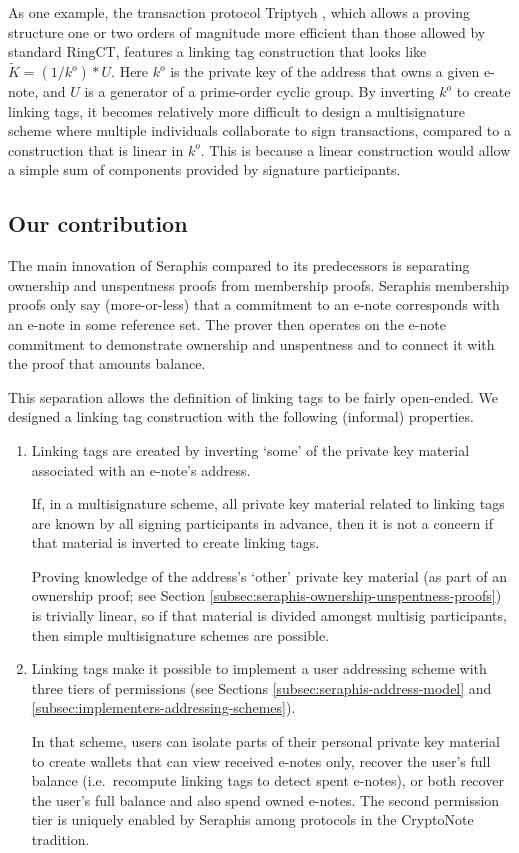 As one example, the transaction protocol Triptych \cite{triptych-preprint}, which allows a proving structure one or two orders of magnitude more efficient than those allowed by standard RingCT, features a linking tag construction that looks like $\tilde{K} = (1/k^o)*U$. Here $k^o$ is the private key of the address that owns a given e-note, and $U$ is a generator of a prime-order cyclic group. By inverting $k^o$ to create linking tags, it becomes relatively more difficult to design a multisignature scheme where multiple individuals collaborate to sign transactions, compared to a construction that is linear in $k^o$. This is because a linear construction would allow a simple sum of components provided by signature participants.


\subsection{Our contribution}
\label{subsec:intro-our-contribution}

The main innovation of Seraphis compared to its predecessors is separating ownership and unspentness proofs from membership proofs. Seraphis membership proofs only say (more-or-less) that a commitment to an e-note corresponds with an e-note in some reference set. The prover then operates on the e-note commitment to demonstrate ownership and unspentness and to connect it with the proof that amounts balance.

This separation allows the definition of linking tags to be fairly open-ended. We designed a linking tag construction with the following (informal) properties.

\begin{enumerate}
    \item Linking tags are created by inverting `some' of the private key material associated with an e-note's address.

    If, in a multisignature scheme, all private key material related to linking tags are known by all signing participants in advance, then it is not a concern if that material is inverted to create linking tags.

    Proving knowledge of the address's `other' private key material (as part of an ownership proof; see Section \ref{subsec:seraphis-ownership-unspentness-proofs}) is trivially linear, so if that material is divided amongst multisig participants, then simple multisignature schemes are possible.

    \item Linking tags make it possible to implement a user addressing scheme with three tiers of permissions (see Sections \ref{subsec:seraphis-address-model} and \ref{subsec:implementers-addressing-schemes}).

    In that scheme, users can isolate parts of their personal private key material to create wallets that can view received e-notes only, recover the user's full balance (i.e.\ recompute linking tags to detect spent e-notes), or both recover the user's full balance and also spend owned e-notes. The second permission tier is uniquely enabled by Seraphis among protocols in the CryptoNote tradition.
\end{enumerate}

